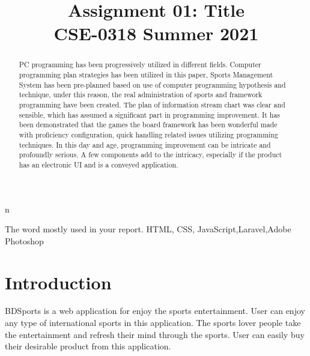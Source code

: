 \documentclass[conference]{IEEEtran}
\begin{document}
\title{Assignment 01: Title\\
{\footnotesize \textsuperscript{}CSE-0318 Summer 2021 }
}

\author{
}

\maketitle

\begin{abstract}

PC programming has been progressively utilized in different fields. Computer programming plan strategies has been utilized in this paper, Sports Management System has been pre-planned based on use of computer programming hypothesis and technique, under this reason, the real administration of sports and framework programming have been created. The plan of information stream chart was clear and sensible, which has assumed a significant part in programming improvement. It has been demonstrated that the games the board framework has been wonderful made with proficiency configuration, quick handling related issues utilizing programming techniques. In this day and age, programming improvement can be intricate and profoundly serious. A few components add to the intricacy, especially if the product has an electronic UI and is a conveyed application. 



\end{abstract}n


\begin{IEEEkeywords}
The word mostly used in your report.
HTML, CSS, JavaScript,Laravel,Adobe Photoshop
\end{IEEEkeywords}

\section{Introduction}
BDSports is a web application for enjoy the sports entertainment. User can enjoy any type of international sports in this application. The sports lover people take the entertainment and refresh their mind through the sports. User can easily buy their desirable product from this application.
\end{document}
